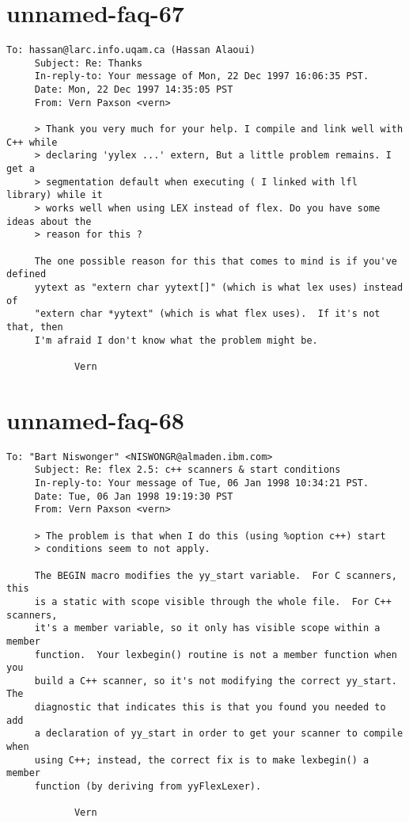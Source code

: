 \documentclass[openany,oneside]{book}
\begin{document}
\section{unnamed-faq-67}

\begin{verbatim}
To: hassan@larc.info.uqam.ca (Hassan Alaoui)
     Subject: Re: Thanks
     In-reply-to: Your message of Mon, 22 Dec 1997 16:06:35 PST.
     Date: Mon, 22 Dec 1997 14:35:05 PST
     From: Vern Paxson <vern>
     
     > Thank you very much for your help. I compile and link well with C++ while
     > declaring 'yylex ...' extern, But a little problem remains. I get a
     > segmentation default when executing ( I linked with lfl library) while it
     > works well when using LEX instead of flex. Do you have some ideas about the
     > reason for this ?
     
     The one possible reason for this that comes to mind is if you've defined
     yytext as "extern char yytext[]" (which is what lex uses) instead of
     "extern char *yytext" (which is what flex uses).  If it's not that, then
     I'm afraid I don't know what the problem might be.
     
     		Vern
\end{verbatim}

\section{unnamed-faq-68}

\begin{verbatim}
To: "Bart Niswonger" <NISWONGR@almaden.ibm.com>
     Subject: Re: flex 2.5: c++ scanners & start conditions
     In-reply-to: Your message of Tue, 06 Jan 1998 10:34:21 PST.
     Date: Tue, 06 Jan 1998 19:19:30 PST
     From: Vern Paxson <vern>
     
     > The problem is that when I do this (using %option c++) start
     > conditions seem to not apply.
     
     The BEGIN macro modifies the yy_start variable.  For C scanners, this
     is a static with scope visible through the whole file.  For C++ scanners,
     it's a member variable, so it only has visible scope within a member
     function.  Your lexbegin() routine is not a member function when you
     build a C++ scanner, so it's not modifying the correct yy_start.  The
     diagnostic that indicates this is that you found you needed to add
     a declaration of yy_start in order to get your scanner to compile when
     using C++; instead, the correct fix is to make lexbegin() a member
     function (by deriving from yyFlexLexer).
     
     		Vern
\end{verbatim}
\end{document}
